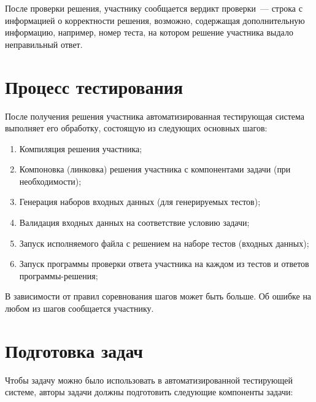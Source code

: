 \documentclass[times,specification,annotation]{style/itmo-student-thesis/itmo-student-thesis}
\begin{document}
После проверки решения, участнику сообщается вердикт проверки~--- строка с информацией о корректности решения, возможно, содержащая дополнительную информацию, например, номер теста, на котором решение участника выдало неправильный ответ.

\section{Процесс тестирования}

После получения решения участника автоматизированная тестирующая система выполняет его обработку, состоящую из следующих основных шагов:

\begin{enumerate}
    \item Компиляция решения участника;
    \item Компоновка (линковка) решения участника с компонентами задачи (при необходимости);
    \item Генерация наборов входных данных (для генерируемых тестов);
    \item Валидация входных данных на соответствие условию задачи;
    \item Запуск исполняемого файла с решением на наборе тестов (входных данных);
    \item Запуск программы проверки ответа участника на каждом из тестов и ответов программы-решения;
\end{enumerate}

В зависимости от правил соревнования шагов может быть больше. Об ошибке на любом из шагов сообщается участнику.

\section{Подготовка задач}

Чтобы задачу можно было использовать в автоматизированной тестирующей системе, авторы задачи должны подготовить следующие компоненты задачи:
\end{document}
